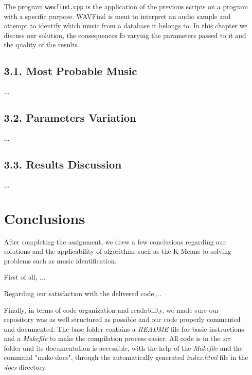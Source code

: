 \documentclass[12pt]{article}
\begin{document}
The program \texttt{wavfind.cpp} is the application of the previous scripts on a 
program with a specific purpose.
WAVFind is ment to interpret an audio sample and attempt to identify which music 
from a database it belongs to.
In this chapter we discuss our solution, the consequences fo varying the 
parameters passed to it and the quality of the results.

\subsection*{3.1. Most Probable Music}

...

\subsection*{3.2. Parameters Variation}

...

\subsection*{3.3. Results Discussion}

...

\newpage
\section*{Conclusions}

After completing the assignment, we drew a few conclusions regarding our 
solutions and the applicability of algorithms such as the K-Means to solving
problems such as music identification.

First of all, ...

Regarding our satisfaction with the delivered code,...

Finally, in terms of code organization and readability, we made sure our 
repository was as well structured as possible and our code properly commented
and documented.
The base folder contains a {\it README\/} file for basic instructions and a 
{\it Makefile\/} to make the compilation process easier.
All code is in the {\it src\/} folder and its documentation is accessible, 
with the help of the {\it Makefile\/} and the command "make docs", through
the automatically generated {\it index.html\/} file in the {\it docs\/} 
directory.
\end{document}
